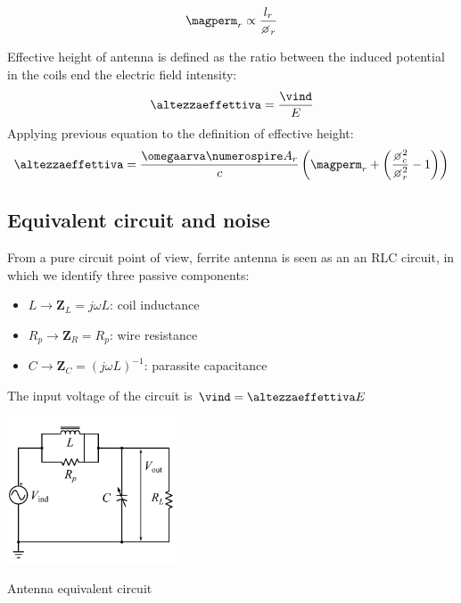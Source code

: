 \begin{equation}
\magperm_r \propto \dfrac{l_r}{\diameter_r}
\end{equation}

Effective height of antenna is defined as the ratio between the induced potential in the coils end the electric field intensity:
\begin{equation}
\altezzaeffettiva = \dfrac{\vind}{E}
\end{equation}
Applying previous equation to the definition of effective height:
\begin{equation}
\altezzaeffettiva = \dfrac{\omegaarva \numerospire A_r}{c} \braces{\magperm_r + \braces{\dfrac{\diameter_c^2}{\diameter_r^2}-1}}
\end{equation}

\subsection{Equivalent circuit and noise}
From a pure circuit point of view, ferrite antenna is seen as an an RLC circuit, in which we identify three passive components:
\begin{itemize}
\item $L\rightarrow\mathbf{Z}_L = j\omega L$: coil inductance
\item $R_p\rightarrow\mathbf{Z}_R = R_p$: wire resistance
\item $C\rightarrow\mathbf{Z}_C = (j\omega L)^{-1}$: parassite capacitance
\end{itemize}
The input voltage of the circuit is $\vind=\altezzaeffettiva E$
\begin{marginfigure}
	\centering
	\includegraphics[width=5cm]{ch2/img/circuito_eq.pdf}
	\caption{Antenna equivalent circuit}
\end{marginfigure}

